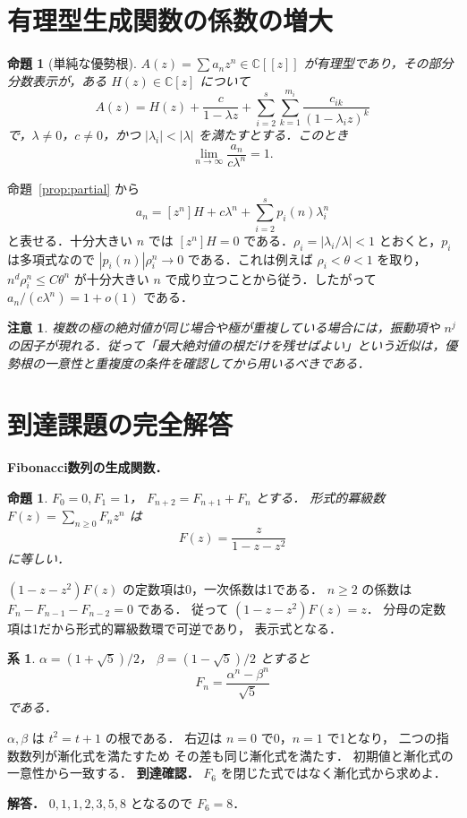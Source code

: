 \documentclass[a5paper,10pt,onecolumn]{jsarticle}
\makeatletter
\theoremstyle{mathnotetheorem}
\newtheorem{proposition}[theorem]{命題}
\newtheorem{corollary}[theorem]{系}
\newtheorem{remark}[theorem]{注意}
\renewcommand{\proofname}{証明}
\renewenvironment{proof}[1][\proofname]{%
  \par\pushQED{\qed}\normalfont\topsep4\p@\@plus2\p@\relax
  \trivlist\item[\hskip\labelsep\bfseries #1]\ignorespaces
}{\popQED\endtrivlist\@endpefalse}
\makeatother
\begin{document}
\section{有理型生成関数の係数の増大}
\begin{proposition}[単純な優勢根]\label{prop:asymptotic}
$A(z)=\sum a_nz^n\in\mathbb C[[z]]$ が有理型であり，その部分分数表示が，ある $H(z)\in\mathbb C[z]$ について
\[
 A(z)=H(z)+\frac{c}{1-\lambda z}
 +\sum_{i=2}^s\sum_{k=1}^{m_i}
  \frac{c_{ik}}{(1-\lambda_i z)^k}
\]
で，$\lambda\ne0$，$c\ne0$，かつ $|\lambda_i|<|\lambda|$ を満たすとする．このとき
\[
 \lim_{n\to\infty}\frac{a_n}{c\lambda^n}=1.
\]
\end{proposition}
\begin{proof}
命題~\ref{prop:partial} から
\[
 a_n=[z^n]H+c\lambda^n+\sum_{i=2}^s p_i(n)\lambda_i^n
\]
と表せる．十分大きい $n$ では $[z^n]H=0$ である．$\rho_i=|\lambda_i/\lambda|<1$ とおくと，$p_i$ は多項式なので
$|p_i(n)|\rho_i^n\to0$ である．これは例えば $\rho_i<\theta<1$ を取り，$n^d\rho_i^n\le C\theta^n$ が十分大きい $n$ で成り立つことから従う．したがって $a_n/(c\lambda^n)=1+o(1)$ である．
\end{proof}
\begin{remark}
複数の極の絶対値が同じ場合や極が重複している場合には，振動項や $n^j$ の因子が現れる．従って「最大絶対値の根だけを残せばよい」という近似は，優勢根の一意性と重複度の条件を確認してから用いるべきである．
\end{remark}


\section{到達課題の完全解答}
\noindent\textbf{Fibonacci数列の生成関数．}
\begin{proposition}
$F_0=0,F_1=1$，
$F_{n+2}=F_{n+1}+F_n$ とする．
形式的冪級数 $F(z)=\sum_{n\ge0}F_nz^n$ は
\[
F(z)=\frac{z}{1-z-z^2}
\]
に等しい．
\end{proposition}
\begin{proof}
$(1-z-z^2)F(z)$ の定数項は0，一次係数は1である．
$n\ge2$ の係数は
$F_n-F_{n-1}-F_{n-2}=0$ である．
従って $(1-z-z^2)F(z)=z$．
分母の定数項は1だから形式的冪級数環で可逆であり，
表示式となる．
\end{proof}
\begin{corollary}
$\alpha=(1+\sqrt5)/2$，
$\beta=(1-\sqrt5)/2$ とすると
\[
F_n=\frac{\alpha^n-\beta^n}{\sqrt5}
\]
である．
\end{corollary}
\begin{proof}
$\alpha,\beta$ は $t^2=t+1$ の根である．
右辺は $n=0$ で0，$n=1$ で1となり，
二つの指数数列が漸化式を満たすため
その差も同じ漸化式を満たす．
初期値と漸化式の一意性から一致する．
\end{proof}
\noindent\textbf{到達確認．}
$F_6$ を閉じた式ではなく漸化式から求めよ．
\par\noindent\textbf{解答．}
$0,1,1,2,3,5,8$ となるので $F_6=8$．
\end{document}
